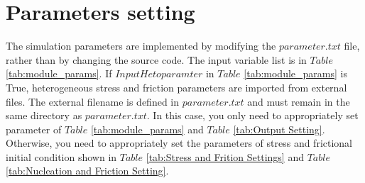 \documentclass[a4paper,12pt]{article}
\begin{document}
\section{Parameters setting}
The simulation parameters are implemented by modifying the $parameter.txt$ file, rather than by changing the source code. The input variable list is in $Table$ \ref{tab:module_params}. If $InputHetoparamter$ in $Table$ \ref{tab:module_params} is True, heterogeneous stress and friction parameters are imported from external files. The external filename is defined in $parameter.txt$ and must remain in the same directory as $parameter.txt$. In this case, you only need to appropriately set parameter of $Table$ \ref{tab:module_params} and $Table$ \ref{tab:Output Setting}. Otherwise, you need to appropriately set the parameters of stress and frictional initial condition shown in  $Table$ \ref{tab:Stress and Frition  Settings} and $Table$ \ref{tab:Nucleation and Friction Setting}.
\end{document}
